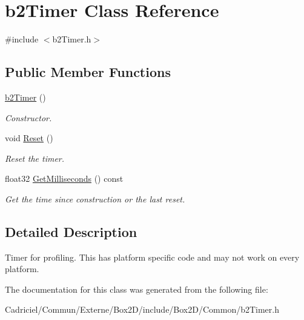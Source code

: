 \hypertarget{classb2_timer}{}\section{b2\+Timer Class Reference}
\label{classb2_timer}


{\ttfamily \#include $<$b2\+Timer.\+h$>$}

\subsection*{Public Member Functions}
\begin{DoxyCompactItemize}
\item 
\hyperlink{classb2_timer_afcc159032a8edeaa9febdf2b6cbd49a5}{b2\+Timer} ()\hypertarget{classb2_timer_afcc159032a8edeaa9febdf2b6cbd49a5}{}\label{classb2_timer_afcc159032a8edeaa9febdf2b6cbd49a5}

\begin{DoxyCompactList}\small\item\em Constructor. \end{DoxyCompactList}\item 
void \hyperlink{classb2_timer_a367388794588e9283600437be82f2889}{Reset} ()\hypertarget{classb2_timer_a367388794588e9283600437be82f2889}{}\label{classb2_timer_a367388794588e9283600437be82f2889}

\begin{DoxyCompactList}\small\item\em Reset the timer. \end{DoxyCompactList}\item 
float32 \hyperlink{classb2_timer_a354e020ec583a067b8f3b90a42a88e53}{Get\+Milliseconds} () const \hypertarget{classb2_timer_a354e020ec583a067b8f3b90a42a88e53}{}\label{classb2_timer_a354e020ec583a067b8f3b90a42a88e53}

\begin{DoxyCompactList}\small\item\em Get the time since construction or the last reset. \end{DoxyCompactList}\end{DoxyCompactItemize}


\subsection{Detailed Description}
Timer for profiling. This has platform specific code and may not work on every platform. 

The documentation for this class was generated from the following file\+:\begin{DoxyCompactItemize}
\item 
Cadriciel/\+Commun/\+Externe/\+Box2\+D/include/\+Box2\+D/\+Common/b2\+Timer.\+h\end{DoxyCompactItemize}
